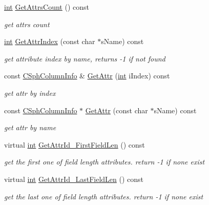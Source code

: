 \begin{DoxyCompactItemize}
\hyperlink{sphinxexpr_8cpp_a4a26e8f9cb8b736e0c4cbf4d16de985e}{int} \hyperlink{classCSphRsetSchema_ac542458ca102654ac712961778d4222b}{Get\-Attrs\-Count} () const 
\begin{DoxyCompactList}\small\item\em get attrs count \end{DoxyCompactList}\item 
\hyperlink{sphinxexpr_8cpp_a4a26e8f9cb8b736e0c4cbf4d16de985e}{int} \hyperlink{classCSphRsetSchema_a84c4f422af61cb61b5429e062d9ba1cb}{Get\-Attr\-Index} (const char $\ast$s\-Name) const 
\begin{DoxyCompactList}\small\item\em get attribute index by name, returns -\/1 if not found \end{DoxyCompactList}\item 
const \hyperlink{structCSphColumnInfo}{C\-Sph\-Column\-Info} \& \hyperlink{classCSphRsetSchema_a12e6fd550adb01751f41616608177ff2}{Get\-Attr} (\hyperlink{sphinxexpr_8cpp_a4a26e8f9cb8b736e0c4cbf4d16de985e}{int} i\-Index) const 
\begin{DoxyCompactList}\small\item\em get attr by index \end{DoxyCompactList}\item 
const \hyperlink{structCSphColumnInfo}{C\-Sph\-Column\-Info} $\ast$ \hyperlink{classCSphRsetSchema_a876eef6b2ab7d0d1fd436f40634d9100}{Get\-Attr} (const char $\ast$s\-Name) const 
\begin{DoxyCompactList}\small\item\em get attr by name \end{DoxyCompactList}\item 
virtual \hyperlink{sphinxexpr_8cpp_a4a26e8f9cb8b736e0c4cbf4d16de985e}{int} \hyperlink{classCSphRsetSchema_ab69084b682dc8ea22f9b20f581e5f272}{Get\-Attr\-Id\-\_\-\-First\-Field\-Len} () const 
\begin{DoxyCompactList}\small\item\em get the first one of field length attributes. return -\/1 if none exist \end{DoxyCompactList}\item 
virtual \hyperlink{sphinxexpr_8cpp_a4a26e8f9cb8b736e0c4cbf4d16de985e}{int} \hyperlink{classCSphRsetSchema_a126a54311560c788882325f16cb63558}{Get\-Attr\-Id\-\_\-\-Last\-Field\-Len} () const 
\begin{DoxyCompactList}\small\item\em get the last one of field length attributes. return -\/1 if none exist \end{DoxyCompactList}\item 

\end{DoxyCompactItemize}
